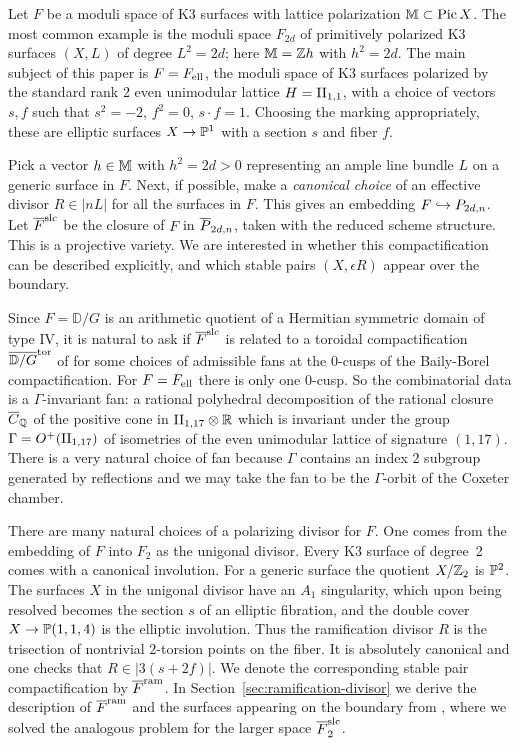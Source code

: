 \documentclass[table,x11names]{amsart}
\begin{document}
Let $F$ be a moduli space of K3 surfaces with lattice
polarization ${\mathbb M}\subset\operatorname{Pic} X$. The most common example is the
moduli space $F_{2d}$ of primitively polarized K3 surfaces $(X,L)$ of
degree $L^2=2d$; here ${\mathbb M} = {\mathbb Z} h$ with $h^2=2d$. The main subject of
this paper is $F=F_{\operatorname{ell}}$, the moduli space of K3 surfaces polarized by
the standard rank 2 even unimodular lattice $H=\II_{1,1}$, with a
choice of vectors $s,f$ such that $s^2=-2$, $f^2=0$, $s\cdot f=1$. 
Choosing the marking appropriately,
these are elliptic surfaces $X\to{\mathbb P}^1$ with a section $s$ and fiber $f$.

Pick a vector $h\in {\mathbb M}$ with $h^2=2d>0$ representing an ample line
bundle $L$ on a generic surface in $F$.
Next, if possible, make a
\emph{canonical choice} of an effective divisor $R\in |nL|$ for all
the surfaces in $F$. This gives an embedding $F\hookrightarrow P_{2d,n}$.  Let
${\overline F}^{\rm slc}$ be the closure of $F$ in ${\overline P}_{2d,n}$,
taken with the reduced scheme structure. This is a projective
variety. We are interested in whether this compactification
can be described explicitly, and which stable pairs $(X,\epsilon R)$ appear
over the boundary.

Since $F=\mathbb{D}/G$ is an arithmetic
quotient of a Hermitian symmetric domain of type IV, it is natural to
ask if ${\overline F}^{\rm slc}$ is related to a toroidal compactification
$\overline{\mathbb{D}/G}^{\rm tor}$
of \cite{ash1975smooth-compactifications}
for some choices of admissible fans at
the 0-cusps of the Baily-Borel compactification. For $F=F_{\operatorname{ell}}$ there is
only one 0-cusp. So the combinatorial data is a $\Gamma$-invariant
fan: a rational polyhedral decomposition of the rational
closure ${\overline C}_{\mathbb{Q}}$ of the positive cone in $\IIell\otimes \R$ which
is invariant under the group
$\Gamma=O^+(\IIell)$ of isometries of the even unimodular
lattice of signature $(1,17)$. There is a very natural choice of fan because
$\Gamma$ contains an index $2$ subgroup generated by reflections
and we may take the fan to be the $\Gamma$-orbit of the Coxeter chamber.

There are many natural choices of a polarizing divisor for
$F$. One comes from the embedding of $F$ into $F_2$ as the
unigonal divisor. Every K3 surface of degree~2 comes with a canonical
involution. For a generic surface the quotient $X/{\mathbb Z}_2$ is
${\mathbb P}^2$. The surfaces $X$ in the unigonal divisor have an $A_1$
singularity, which upon being resolved becomes the section $s$
of an elliptic fibration, and the double cover $X\to {\mathbb P}(1,1,4)$
is the elliptic involution. Thus the ramification divisor $R$ is the trisection
of nontrivial $2$-torsion points on the fiber.
It is absolutely canonical and one checks that $R\in |3(s+2f)|$.
We denote the corresponding stable pair
compactification by ${\overline F}^{{\rm ram}}$. In Section~\ref{sec:ramification-divisor} we
derive the description of
${\overline F}^{{\rm ram}}$ and the surfaces appearing on the boundary from
\cite{alexeev2019stable-pair}, where we solved the analogous problem
for the larger space ${\overline F}_2^{\rm slc}$.
\end{document}
